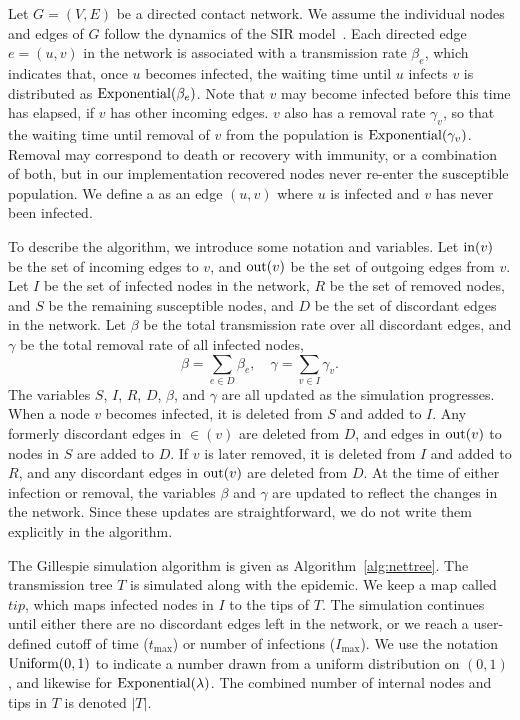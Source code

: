 Let $G = (V, E)$ be a directed contact network. We assume the individual nodes
and edges of $G$ follow the dynamics of the \gls{SIR}
model~\autocite{kermack1927contribution}. Each directed edge $e = (u, v)$ in
the network is associated with a transmission rate $\beta_e$, which indicates
that, once $u$ becomes infected, the waiting time until $u$ infects $v$ is
distributed as $\operatorname{Exponential}(\beta_e)$. Note that $v$ may become infected
before this time has elapsed, if $v$ has other incoming edges. $v$ also has a
removal rate $\gamma_v$, so that the waiting time until removal of $v$ from the
population is $\operatorname{Exponential}(\gamma_v)$. Removal may correspond to death or
recovery with immunity, or a combination of both, but in our implementation
recovered nodes never re-enter the susceptible population. We define a
 as an edge $(u, v)$ where $u$ is infected and $v$ has
never been infected.

To describe the algorithm, we introduce some notation and variables. Let
$\operatorname{in}(v)$ be the set of incoming edges to $v$, and $\operatorname{out}(v)$ be the set of
outgoing edges from $v$. Let $I$ be the set of infected nodes in the network,
$R$ be the set of removed nodes, and $S$ be the remaining susceptible nodes,
and $D$ be the set of discordant edges in the network. Let $\beta$ be the total
transmission rate over all discordant edges, and $\gamma$ be the total removal
rate of all infected nodes,
\[
  \beta = \sum_{e \in D} \beta_e, \quad
  \gamma = \sum_{v \in I} \gamma_v.
\]
The variables $S$, $I$, $R$, $D$, $\beta$, and $\gamma$ are all updated as the
simulation progresses. When a node $v$ becomes infected, it is deleted from $S$
and added to $I$. Any formerly discordant edges in $\in(v)$ are deleted from
$D$, and edges in $\operatorname{out}(v)$ to nodes in $S$ are added to $D$. If $v$ is later
removed, it is deleted from $I$ and added to $R$, and any discordant edges in
$\operatorname{out}(v)$ are deleted from $D$. At the time of either infection or removal, the
variables $\beta$ and $\gamma$ are updated to reflect the changes in the
network. Since these updates are straightforward, we do not write them
explicitly in the algorithm.

\newcommand{\tip}{\mathit{tip}}

The Gillespie simulation algorithm is given as Algorithm~\ref{alg:nettree}. The
transmission tree $T$ is simulated along with the epidemic. We keep a map
called $\tip$, which maps infected nodes in $I$ to the tips of $T$. The
simulation continues until either there are no discordant edges left in the
network, or we reach a user-defined cutoff of time ($t_{\max}$) or number of
infections ($I_{\max}$). We use the notation $\operatorname{Uniform}(0, 1)$ to indicate a
number drawn from a uniform distribution on $(0, 1)$, and likewise for
$\operatorname{Exponential}(\lambda)$. The combined number of internal nodes and tips in $T$
is denoted $|T|$.

